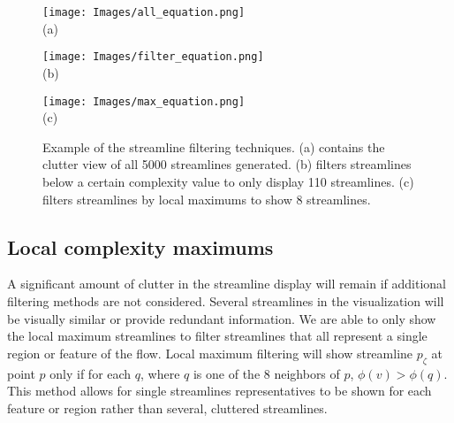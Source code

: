 \documentclass{egpubl}
\begin{document}
\begin{figure}[h]
        \centering
                \begin{minipage}{0.30\linewidth}
                        \small \centering
                       	\texttt{[image: Images/all\_equation.png]}\\(a)
                \end{minipage}
                \begin{minipage}{0.30\linewidth}
                        \small \centering
                        \texttt{[image: Images/filter\_equation.png]}\\(b)
                \end{minipage}
                \begin{minipage}{0.30\linewidth}
                        \small \centering
                        \texttt{[image: Images/max\_equation.png]}\\(c)
                \end{minipage}
        \caption{Example of the streamline filtering techniques. (a) contains the clutter view of all 5000 streamlines generated. (b) filters streamlines below a certain complexity value to only display 110 streamlines. (c)  filters streamlines by local maximums to show 8 streamlines.}
        \label{fig:value_filter}
\end{figure}

\subsection{Local complexity maximums}
A significant amount of clutter in the streamline display will remain if additional filtering methods are not considered.
Several streamlines in the visualization will be visually similar or provide redundant information.
We are able to only show the local maximum streamlines to filter streamlines that all represent a single region or feature of the flow.
Local maximum filtering will show streamline $p_\zeta$ at point  $p$ only if for each $q$, where $q$ is one of the 8 neighbors of $p$, $\phi(v) > \phi(q)$.
This method allows for single streamlines representatives to be shown for each feature or region rather than several, cluttered streamlines.
\end{document}
